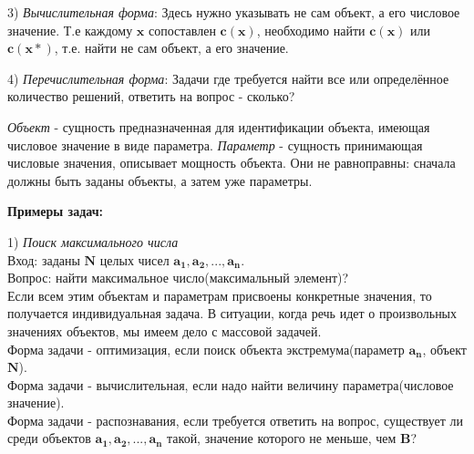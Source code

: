     \par 3) \textit{Вычислительная форма}:
    Здесь нужно указывать не сам объект, а его числовое значение. Т.е каждому $\boldsymbol{x}$ сопоставлен $\boldsymbol{c(x)}$, необходимо найти $\boldsymbol{c(x)}$ или $\boldsymbol{c(x*)}$, т.е. найти не сам объект, а его значение.
    
    \par 4) \textit{Перечислительная форма}: 
    Задачи где требуется найти все или определённое количество решений, ответить на вопрос - сколько?\\
    
    \par \textit{Объект} - сущность предназначенная для идентификации объекта, имеющая числовое значение в виде параметра. \textit{Параметр} - сущность принимающая числовые значения, описывает мощность объекта. Они не равноправны: сначала должны быть заданы объекты, а затем уже параметры.
    
    \clearpage

    \textbf{Примеры задач:}
    
    \par 1) \textit{Поиск максимального числа}
    \\
    Вход: заданы $\boldsymbol{N}$ целых чисел $\boldsymbol{a_1, a_2, ... , a_n}$.
    \\
    Вопрос: найти максимальное число(максимальный элемент)?
    \\
    Если всем этим объектам и параметрам присвоены конкретные значения, то получается индивидуальная задача. В ситуации, когда
    речь идет о произвольных значениях объектов, мы имеем дело с массовой задачей. \\
    Форма задачи - оптимизация, если поиск объекта экстремума(параметр $\boldsymbol{a_n}$, объект $\boldsymbol{N}$).\\
    Форма задачи - вычислительная, если надо найти величину параметра(числовое значение).\\
    Форма задачи - распознавания, если требуется ответить на вопрос, существует ли среди объектов $\boldsymbol{a_1, a_2, ... , a_n}$ такой, значение которого не меньше, чем $\boldsymbol{B}$?
    
